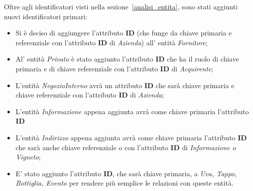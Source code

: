 Oltre agli identificatori visti nella sezione~\ref{analisi_entita}, sono stati aggiunti nuovi identificatori primari:

\begin{itemize}
	\item Si è deciso di aggiungere l'attributo \textbf{ID} (che funge da chiave primaria e referenziale con l'attributo \textbf{ID} di \emph{Azienda}) all' entità \emph{Fornitore};
	\item Al' entità \emph{Privato} è stato aggiunto l'attributo \textbf{ID} che ha il ruolo di chiave primaria e di chiave referenziale con l'attributo \textbf{ID} di \emph{Acquirente};
	\item L'entità \emph{NegozioInterno} avrà un attributo \textbf{ID} che sarà chiave primaria e chiave referenziale con l'attributo \textbf{ID} di \emph{Azienda};
	\item L'entità \emph{Informazione} appena aggiunta avrà come chiave primaria l'attributo \textbf{ID}
	\item L'entità \emph{Indirizzo} appena aggiunta avrà come chiave primaria l'attributo \textbf{ID} che sarà anche chiave referenziale o con l'attributo \textbf{ID} di \emph{Informazione o Vigneto};
	\item E' stato aggiunto l'attributo \textbf{ID}, che sarà chiave primaria, a \emph{Uva, Tappo, Bottiglia, Evento} per rendere più semplice le relazioni con queste entità.
\end{itemize}